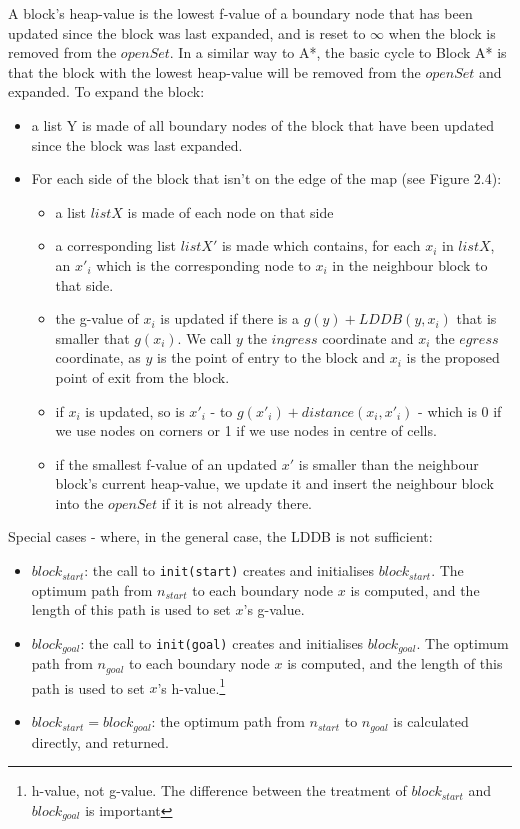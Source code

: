 \documentclass[12pt,notitlepage]{report}
\begin{document}
\noindent
A block's heap-value is the lowest f-value of a boundary node that has been updated since the block was last expanded, and is reset to {$\infty$} when the block is removed from the {$openSet$}. In a similar way to A*, the basic cycle to Block A* is that the block with the lowest heap-value will be removed from the {$openSet$} and expanded. To expand the block:
\begin{itemize}
\item a list Y is made of all boundary nodes of the block that have been updated since the block was last expanded. 
\item For each side of the block that isn't on the edge of the map (see Figure 2.4):
  \begin{itemize}
  \item a list {$listX$} is made of each node on that side
  \item a corresponding list {$listX'$} is made which contains, for each {$x_{i}$} in {$listX$}, an {$x'_{i}$} which is the corresponding node to {$x_{i}$} in the neighbour block to that side.
  \item the g-value of {$x_{i}$} is updated if there is a {$g(y) + LDDB(y,x_{i})$} that is smaller that {$g(x_{i})$}. We call $y$ the $ingress$ coordinate and $x_{i}$ the $egress$ coordinate, as $y$ is the point of entry to the block and $x_{i}$ is the proposed point of exit from the block. 
  \item if {$x_{i}$} is updated, so is {$x'_{i}$} - to {$g(x'_{i})+ distance(x_{i},x'_{i})$} - which is 0 if we use nodes on corners or 1 if we use nodes in centre of cells.
  \item if the smallest f-value of an updated {$x'$} is smaller than the neighbour block's current heap-value, we update it and insert the neighbour block into the {$openSet$} if it is not already there.
  \end{itemize}
\end{itemize}
\noindent
Special cases - where, in the general case, the LDDB is not sufficient:
\begin{itemize} 
\item {\em $block_{start}$}: the call to {\tt init(start)} creates and initialises $block_{start}$. The optimum path from {$n_{start}$} to each boundary node {$x$} is computed, and the length of this path is used to set {$x$}'s g-value.
\item {\em $block_{goal}$}: the call to {\tt init(goal)} creates and initialises {$block_{goal}$}. The optimum path from $n_{goal}$ to each boundary node {$x$} is computed, and the length of this path is used to set {$x$}'s h-value.\footnote{h-value, not g-value. The difference between the treatment of $block_{start}$ and $block_{goal}$ is important}
\item{\em $block_{start} = block_{goal}$}: the optimum path from {$n_{start}$} to {$n_{goal}$} is calculated directly, and returned.
\end{itemize}
\end{document}
